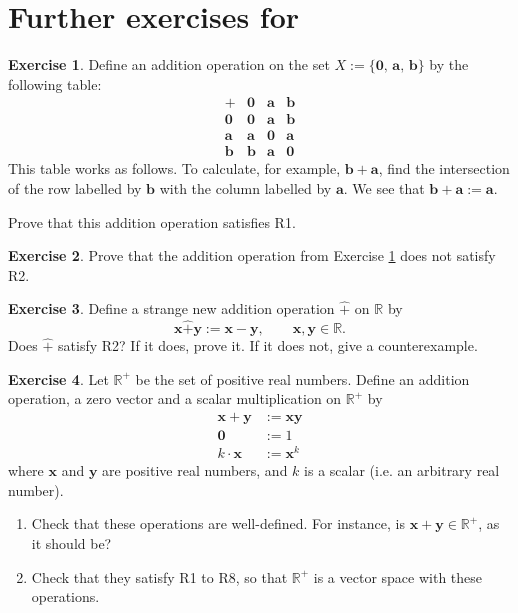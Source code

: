 \documentclass[a4paper,11pt]{book}
\theoremstyle{definition}
\newtheorem{exercise}{Exercise}
\newcommand{\ve}[1]{\mathbf{#1}}
\newcommand{\furtherexercises}{\section*{Further exercises for \thesection}}
\begin{document}
\furtherexercises
\begin{exercise} \label{non_ass_ex} Define an addition operation on the set $X := \{ \ve{0}, \, \ve{a}, \, \ve{b} \}$ by the following table:
\[
 \begin{array}{c|ccc}
 	+ & \ve{0} & \ve{a} & \ve{b} \\ 
 	\hline
 	\ve{0} & \ve{0} & \ve{a} & \ve{b} \\
 	\ve{a} & \ve{a} & \ve{0} & \ve{a} \\
 	\ve{b} & \ve{b} & \ve{a} & \ve{0}
 \end{array}
\]
This table works as follows. To calculate, for example, $\ve{b} + \ve{a}$, find the intersection of the row labelled by $\ve{b}$ with the column labelled by $\ve{a}$. We see that $\ve{b} + \ve{a} := \ve{a}$. 

Prove that this addition operation satisfies R1.
\end{exercise}

\begin{exercise} Prove that the addition operation from Exercise \ref{non_ass_ex} does not satisfy R2.
\end{exercise}

\begin{exercise} Define a strange new addition operation $\hat{+}$ on $\mathbb{R}$ by 
\[
 \ve{x} \hat{+} \ve{y} := \ve{x} - \ve{y}, \qquad \ve{x}, \ve{y} \in \mathbb{R}.
\]
Does $\hat{+}$ satisfy R2? If it does, prove it. If it does not, give a counterexample.
\end{exercise}

\begin{exercise} Let $\mathbb{R}^+$ be the set of positive real numbers. Define an addition operation, a zero vector and a scalar multiplication on $\mathbb{R}^+$ by
\begin{align*}
  \ve{x} + \ve{y} &:= \ve{x} \ve{y} \\
   \ve{0} & := 1 \\
   k \cdot \ve{x} &:= \ve{x}^k
\end{align*}
where $\ve{x}$ and $\ve{y}$ are positive real numbers, and $k$ is a scalar (i.e. an arbitrary real number). 
 \begin{enumerate}
 	\item Check that these operations are well-defined. For instance, is $\ve{x} + \ve{y} \in \mathbb{R}^+$, as it should be?
 	\item Check that they satisfy R1 to R8, so that $\mathbb{R}^+$ is a vector space with these operations.
 \end{enumerate}

\end{exercise}
\end{document}

